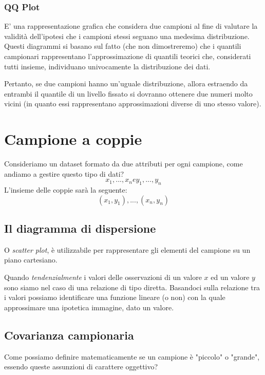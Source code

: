 \subsubsection{QQ Plot} 
E' una rappresentazione grafica che considera due campioni al fine di valutare la validità dell’ipotesi che i campioni stessi seguano una medesima distribuzione. Questi diagrammi si basano sul fatto (che non dimostreremo) che i quantili campionari rappresentano l’approssimazione di quantili teorici che, considerati tutti insieme, individuano univocamente la distribuzione dei dati.

Pertanto, se due campioni hanno un’uguale distribuzione, allora estraendo da entrambi il quantile di un livello fissato si dovranno ottenere due numeri molto vicini (in quanto essi rappresentano approssimazioni diverse di uno stesso valore).


\section{Campione a coppie}
Consideriamo un dataset formato da due attributi per ogni campione, come andiamo a gestire questo tipo di dati?
\begin{equation*}
		x_1, ..., x_n e y_1, ..., y_n
	\end{equation*}
	L'insieme delle coppie sarà la seguente:
\begin{equation*}
		{(x_1, y_1), ..., (x_n, y_n)}
	\end{equation*}
\subsection{Il diagramma di dispersione}
O \emph{scatter plot}, è utilizzabile per rappresentare gli elementi del campione su un piano cartesiano. %

Quando \emph{tendenzialmente} i valori delle osservazioni di un valore $x$ ed un valore $y$ sono siamo nel caso di una relazione di tipo diretta. Basandoci sulla relazione tra i valori possiamo identificare una funzione lineare (o non) con la quale approssimare una ipotetica immagine, dato un valore. 

\subsection{Covarianza campionaria}
Come possiamo definire matematicamente se un campione è "piccolo" o "grande", essendo queste assunzioni di carattere oggettivo? 

